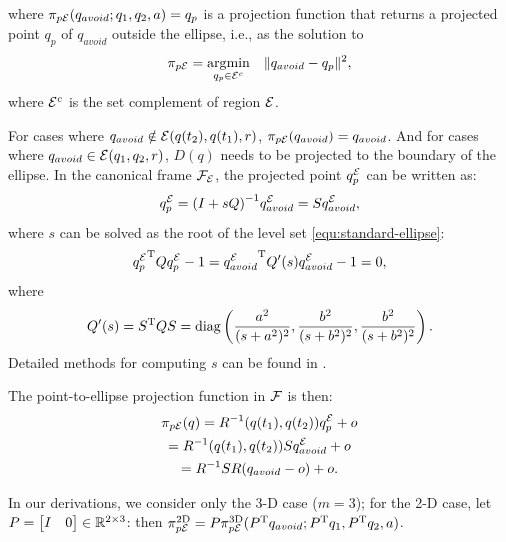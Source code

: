 \documentclass[10pt,twocolumn,twoside]{IEEEtran}
\begin{document}
where $\pi_{p\mathcal{E}}(q_{avoid};q_1,q_2,a) = q_p$ is a projection function that returns a projected point $q_p$ of $q_{avoid}$ outside the ellipse, i.e., as the solution to
\begin{equation}\label{eq:ellipse-point-projection}
\pi_{p\mathcal{E}}=\operatorname*{\arg\!\min}_{q_p\in\mathcal{E}^c} \quad \lVert q_{avoid}-q_p\rVert^2,
\end{equation}
where $\mathcal{E}^{c}$ is the set complement of region $\mathcal{E}$.

For cases where $q_{avoid} \notin \mathcal{E}(q(t_2),q(t_1),r)$, $\pi_{p\mathcal{E}}(q_{avoid}) = q_{avoid}$. And for cases where $q_{avoid} \in \mathcal{E}(q_1,q_2,r)$, $D(q)$ needs to be projected to the boundary of the ellipse. 
In the canonical frame $\mathcal{F}_{\mathcal{E}}$, the projected point $q^{\mathcal{E}}_{p}$ can be written as:
  \begin{equation}
  	q^{\mathcal{E}}_{p} = {(I+sQ)}^{-1} q^{\mathcal{E}}_{avoid} = S q^{\mathcal{E}}_{avoid},
  \end{equation}
where $s$ can be solved as the root of the level set \eqref{equ:standard-ellipse}:
  \begin{equation}
    {q^{\mathcal{E}}_p}^\mathrm{T} Q q^{\mathcal{E}}_p-1={q^{\mathcal{E}}_{avoid}}^\mathrm{T} Q'(s) q^{\mathcal{E}}_{avoid} -1=0,
  \end{equation}
  where
  \begin{equation}
    Q'(s) =S^\mathrm{T} Q S = \operatorname{diag}\left(\frac{a^{2}}{(s+a^{2})^2}, \frac{b^{2}}{(s+b^{2})^2},\frac{b^{2}}{(s+b^{2})^2}\right).
  \end{equation}
 Detailed methods for computing $s$ can be found in \cite{yang2021multi,yang2020multi,eberly}. 


The point-to-ellipse projection function in $\mathcal{F}$ is then:
  \begin{multline}\label{equ:Point2EllipseProjection}
    \pi_{p\mathcal{E}}(q)= R^{-1}(q(t_1),q(t_2))q^{\mathcal{E}}_p+o \\
    = R^{-1}(q(t_1),q(t_2))Sq^{\mathcal{E}}_{avoid}+o\\
    = R^{-1}S R ( q_{avoid}- o)+o.
  \end{multline}
  
In our derivations, we consider only the 3-D case ($m=3$); for the 2-D case, let $P=\begin{bmatrix}I & 0\end{bmatrix}\in\mathbb{R}^{2\times 3}{}$: then $\pi_{p\mathcal{E}}^{\textrm{2D}}=P\pi_{p\mathcal{E}}^{\textrm{3D}}(P^\mathrm{T} q_{avoid}; P^\mathrm{T} q_1, P^\mathrm{T} q_2,a)$.
\end{document}
